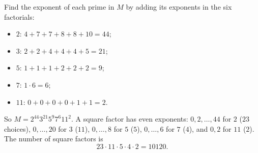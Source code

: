 Find the exponent of each prime in $M$ by adding its exponents in the six factorials:
\begin{itemize}
\item $2$: $4+7+7+8+8+10=44$;
\item $3$: $2+2+4+4+4+5=21$;
\item $5$: $1+1+1+2+2+2=9$;
\item $7$: $1\cdot6=6$;
\item $11$: $0+0+0+0+1+1=2$.
\end{itemize}
So $M=2^{44}3^{21}5^9 7^6 11^2$. A square factor has even exponents: $0,2,\dots,44$ for $2$ ($23$ choices), $0,\dots,20$ for $3$ ($11$), $0,\dots,8$ for $5$ ($5$), $0,\dots,6$ for $7$ ($4$), and $0,2$ for $11$ ($2$). The number of square factors is
\[23\cdot11\cdot5\cdot4\cdot2=\boxed{10120}.\]
